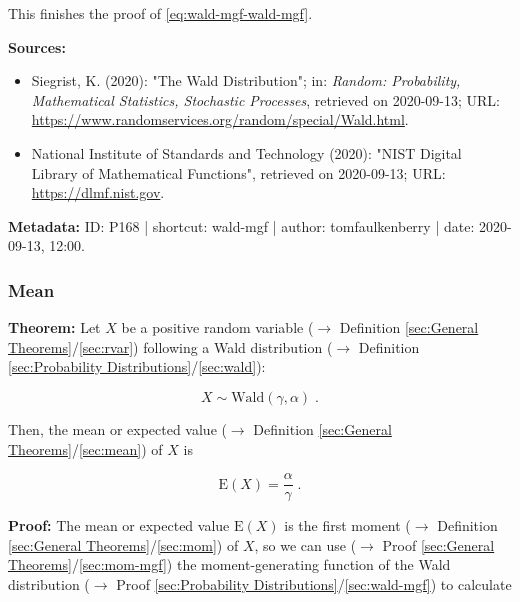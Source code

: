 \documentclass[a4paper,12pt,twoside]{book}
\begin{document}
This finishes the proof of \eqref{eq:wald-mgf-wald-mgf}.


\vspace{1em}
\textbf{Sources:}
\begin{itemize}
\item Siegrist, K. (2020): "The Wald Distribution"; in: \textit{Random: Probability, Mathematical Statistics, Stochastic Processes}, retrieved on 2020-09-13; URL: \url{https://www.randomservices.org/random/special/Wald.html}.
\item National Institute of Standards and Technology (2020): "NIST Digital Library of Mathematical Functions", retrieved on 2020-09-13; URL: \url{https://dlmf.nist.gov}.
\end{itemize}


\vspace{1em}
\textbf{Metadata:} ID: P168 | shortcut: wald-mgf | author: tomfaulkenberry | date: 2020-09-13, 12:00.
\vspace{1em}



\subsubsection[\textbf{Mean}]{Mean} \label{sec:wald-mean}
\setcounter{equation}{0}

\textbf{Theorem:} Let $X$ be a positive random variable ($\rightarrow$ Definition \ref{sec:General Theorems}/\ref{sec:rvar}) following a Wald distribution ($\rightarrow$ Definition \ref{sec:Probability Distributions}/\ref{sec:wald}):

\begin{equation} \label{eq:wald-mean-wald}
X \sim \mathrm{Wald}(\gamma, \alpha) \; .
\end{equation}

Then, the mean or expected value ($\rightarrow$ Definition \ref{sec:General Theorems}/\ref{sec:mean}) of $X$ is

\begin{equation} \label{eq:wald-mean-wald-mean}
\mathrm{E}(X) = \frac{\alpha}{\gamma} \; .
\end{equation}


\vspace{1em}
\textbf{Proof:} The mean or expected value $\mathrm{E}(X)$ is the first moment ($\rightarrow$ Definition \ref{sec:General Theorems}/\ref{sec:mom}) of $X$, so we can use ($\rightarrow$ Proof \ref{sec:General Theorems}/\ref{sec:mom-mgf}) the moment-generating function of the Wald distribution ($\rightarrow$ Proof \ref{sec:Probability Distributions}/\ref{sec:wald-mgf}) to calculate
\end{document}
